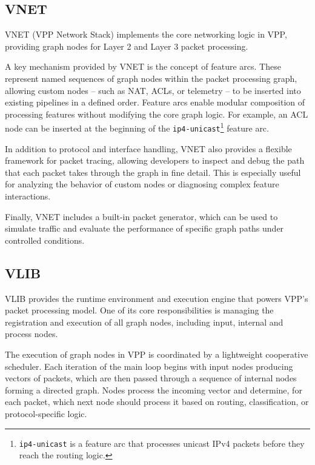 \subsection{VNET}
VNET (VPP Network Stack) implements the core networking logic in VPP, providing graph nodes for Layer 2 and Layer 3 packet processing.

A key mechanism provided by VNET is the concept of feature arcs. 
These represent named sequences of graph nodes within the packet processing graph, allowing custom nodes -- such as NAT, ACLs, or telemetry -- to be inserted into existing pipelines in a defined order. 
Feature arcs enable modular composition of processing features without modifying the core graph logic. For example, an ACL node can be inserted at the beginning of the 
\texttt{ip4-unicast}\footnote{\texttt{ip4-unicast} is a feature arc that processes unicast IPv4 packets before they reach the routing logic.} feature arc.

In addition to protocol and interface handling, VNET also provides a flexible framework for packet tracing, 
allowing developers to inspect and debug the path that each packet takes through the graph in fine detail. 
This is especially useful for analyzing the behavior of custom nodes or diagnosing complex feature interactions.

Finally, VNET includes a built-in packet generator, which can be used to simulate traffic and evaluate the performance of specific graph paths under 
controlled conditions.~\cite{fdio-vpp-vnet-2506, fdio-vpp-featurearcs-2506}

\subsection{VLIB}
VLIB provides the runtime environment and execution engine that powers VPP’s packet processing model.
One of its core responsibilities is managing the registration and execution of all graph nodes, including input, internal and process nodes.

The execution of graph nodes in VPP is coordinated by a lightweight cooperative scheduler.
Each iteration of the main loop begins with input nodes producing vectors of packets, which are then passed through a sequence of internal nodes forming a directed graph.
Nodes process the incoming vector and determine, for each packet, which next node should process it based on routing, classification, or protocol-specific logic.

